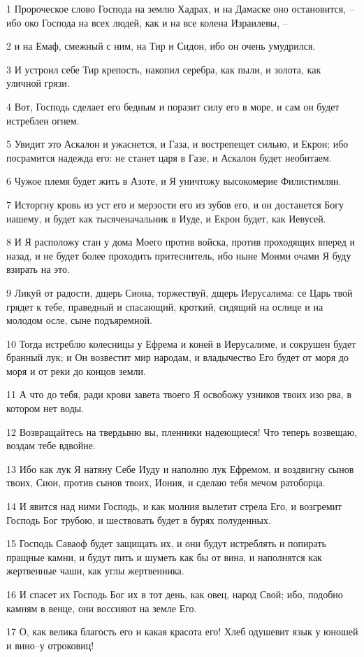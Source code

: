 \par 1 Пророческое слово Господа на землю Хадрах, и на Дамаске оно остановится, --ибо око Господа на всех людей, как и на все колена Израилевы, --
\par 2 и на Емаф, смежный с ним, на Тир и Сидон, ибо он очень умудрился.
\par 3 И устроил себе Тир крепость, накопил серебра, как пыли, и золота, как уличной грязи.
\par 4 Вот, Господь сделает его бедным и поразит силу его в море, и сам он будет истреблен огнем.
\par 5 Увидит это Аскалон и ужаснется, и Газа, и вострепещет сильно, и Екрон; ибо посрамится надежда его: не станет царя в Газе, и Аскалон будет необитаем.
\par 6 Чужое племя будет жить в Азоте, и Я уничтожу высокомерие Филистимлян.
\par 7 Исторгну кровь из уст его и мерзости его из зубов его, и он достанется Богу нашему, и будет как тысяченачальник в Иуде, и Екрон будет, как Иевусей.
\par 8 И Я расположу стан у дома Моего против войска, против проходящих вперед и назад, и не будет более проходить притеснитель, ибо ныне Моими очами Я буду взирать на это.
\par 9 Ликуй от радости, дщерь Сиона, торжествуй, дщерь Иерусалима: се Царь твой грядет к тебе, праведный и спасающий, кроткий, сидящий на ослице и на молодом осле, сыне подъяремной.
\par 10 Тогда истреблю колесницы у Ефрема и коней в Иерусалиме, и сокрушен будет бранный лук; и Он возвестит мир народам, и владычество Его будет от моря до моря и от реки до концов земли.
\par 11 А что до тебя, ради крови завета твоего Я освобожу узников твоих изо рва, в котором нет воды.
\par 12 Возвращайтесь на твердыню вы, пленники надеющиеся! Что теперь возвещаю, воздам тебе вдвойне.
\par 13 Ибо как лук Я натяну Себе Иуду и наполню лук Ефремом, и воздвигну сынов твоих, Сион, против сынов твоих, Иония, и сделаю тебя мечом ратоборца.
\par 14 И явится над ними Господь, и как молния вылетит стрела Его, и возгремит Господь Бог трубою, и шествовать будет в бурях полуденных.
\par 15 Господь Саваоф будет защищать их, и они будут истреблять и попирать пращные камни, и будут пить и шуметь как бы от вина, и наполнятся как жертвенные чаши, как углы жертвенника.
\par 16 И спасет их Господь Бог их в тот день, как овец, народ Свой; ибо, подобно камням в венце, они воссияют на земле Его.
\par 17 О, как велика благость его и какая красота его! Хлеб одушевит язык у юношей и вино--у отроковиц!

